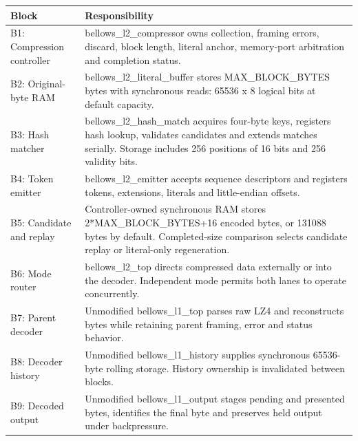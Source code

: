 \documentclass[11pt,a4paper]{article}
\begin{document}
{\small\renewcommand{\arraystretch}{1.18}\begin{longtable}{@{}L{0.24\textwidth}|L{0.7\textwidth}@{}}\toprule

\textbf{Block} & \textbf{Responsibility}\\\midrule\endhead

B1: Compression controller & bellows\_\allowbreak{}l2\_\allowbreak{}compressor owns collection,\allowbreak{} framing errors,\allowbreak{} discard,\allowbreak{} block length,\allowbreak{} literal anchor,\allowbreak{} memory-port arbitration and completion status.\\[2pt]\hline

B2: Original-byte RAM & bellows\_\allowbreak{}l2\_\allowbreak{}literal\_\allowbreak{}buffer stores MAX\_\allowbreak{}BLOCK\_\allowbreak{}BYTES bytes with synchronous reads: 65536 x 8 logical bits at default capacity.\\[2pt]\hline

B3: Hash matcher & bellows\_\allowbreak{}l2\_\allowbreak{}hash\_\allowbreak{}match acquires four-byte keys,\allowbreak{} registers hash lookup,\allowbreak{} validates candidates and extends matches serially. Storage includes 256 positions of 16 bits and 256 validity bits.\\[2pt]\hline

B4: Token emitter & bellows\_\allowbreak{}l2\_\allowbreak{}emitter accepts sequence descriptors and registers tokens,\allowbreak{} extensions,\allowbreak{} literals and little-endian offsets.\\[2pt]\hline

B5: Candidate and replay & Controller-owned synchronous RAM stores 2*\allowbreak{}MAX\_\allowbreak{}BLOCK\_\allowbreak{}BYTES+\allowbreak{}16 encoded bytes,\allowbreak{} or 131088 bytes by default. Completed-size comparison selects candidate replay or literal-only regeneration.\\[2pt]\hline

B6: Mode router & bellows\_\allowbreak{}l2\_\allowbreak{}top directs compressed data externally or into the decoder. Independent mode permits both lanes to operate concurrently.\\[2pt]\hline

B7: Parent decoder & Unmodified bellows\_\allowbreak{}l1\_\allowbreak{}top parses raw LZ4 and reconstructs bytes while retaining parent framing,\allowbreak{} error and status behavior.\\[2pt]\hline

B8: Decoder history & Unmodified bellows\_\allowbreak{}l1\_\allowbreak{}history supplies synchronous 65536-byte rolling storage. History ownership is invalidated between blocks.\\[2pt]\hline

B9: Decoded output & Unmodified bellows\_\allowbreak{}l1\_\allowbreak{}output stages pending and presented bytes,\allowbreak{} identifies the final byte and preserves held output under backpressure.\\[2pt]\hline

\bottomrule\end{longtable}}
\end{document}
